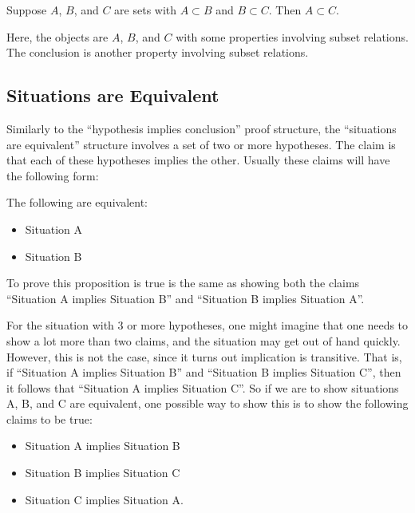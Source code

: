 \begin{proposition}
Suppose $A$, $B$, and $C$ are sets with $A \subset B$ and $B \subset C$. Then $A \subset C$.
\end{proposition}

Here, the objects are $A$, $B$, and $C$ with some properties involving subset relations. The conclusion is another property involving subset relations.

\subsection{Situations are Equivalent}

Similarly to the ``hypothesis implies conclusion'' proof structure, the ``situations are equivalent'' structure involves a set of two or more hypotheses. The claim is that each of these hypotheses implies the other. Usually these claims will have the following form:

\begin{proposition}
The following are equivalent:
\begin{itemize}
	\item Situation A
	\item Situation B
\end{itemize}
\end{proposition}

To prove this proposition is true is the same as showing both the claims ``Situation A implies Situation B'' and ``Situation B implies Situation A''. 

For the situation with $3$ or more hypotheses, one might imagine that one needs to show a lot more than two claims, and the situation may get out of hand quickly. However, this is not the case, since it turns out implication is transitive. That is, if ``Situation A implies Situation B'' and ``Situation B implies Situation C'', then it follows that ``Situation A implies Situation C''. So if we are to show situations A, B, and C are equivalent, one possible way to show this is to show the following claims to be true:

\begin{itemize}
	\item Situation A implies Situation B
	\item Situation B implies Situation C
	\item Situation C implies Situation A.
\end{itemize}

